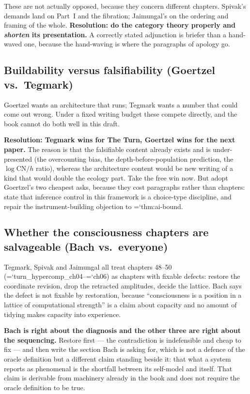 \documentclass[11pt,letterpaper]{article}
\newcommand{\loc}[1]{{\small\ttfamily\color{accent}\hyphenchar\font=`\-\relax #1}}
\newcommand{\fnd}[1]{\textbf{\color{warn}#1}}
\newcommand{\CN}{\mathrm{CN}}
\begin{document}
These are not actually opposed, because they concern different
chapters. Spivak's demands land on Part~I and the fibration; Jaimungal's
on the ordering and framing of the whole. \fnd{Resolution: do the
category theory properly and \emph{shorten} its presentation.} A
correctly stated adjunction is briefer than a hand-waved one, because
the hand-waving is where the paragraphs of apology go.

\subsection*{Buildability versus falsifiability (Goertzel vs.\ Tegmark)}

Goertzel wants an architecture that runs; Tegmark wants a number that
could come out wrong. Under a fixed writing budget these compete
directly, and the book cannot do both well in this draft.

\fnd{Resolution: Tegmark wins for The Turn, Goertzel wins for the next
paper.} The reason is that the falsifiable content already exists and
is under-presented (the overcounting bias, the depth-before-population
prediction, the $\log \CN / h$ ratio), whereas the architecture content
would be new writing of a kind that would double the ecology part. Take
the free win now. But adopt Goertzel's two cheapest asks, because they
cost paragraphs rather than chapters: state that inference control in
this framework is a choice-type discipline, and repair the
instrument-building objection to \loc{thm:ai-bound}.

\subsection*{Whether the consciousness chapters are salvageable
(Bach vs.\ everyone)}

Tegmark, Spivak and Jaimungal all treat
chapters 48--50 (\loc{turn\_hypercomp\_ch04}--\loc{ch06}) as chapters with fixable
defects: restore the coordinate revision, drop the retracted
amplitudes, decide the lattice. Bach says the defect is not fixable by
restoration, because ``consciousness is a position in a lattice of
computational strength'' is a claim about capacity and no amount of
tidying makes capacity into experience.

\fnd{Bach is right about the diagnosis and the other three are right
about the sequencing.} Restore first --- the contradiction is
indefensible and cheap to fix --- and then write the section Bach is
asking for, which is not a defence of the oracle definition but a
different claim standing beside it: that what a system reports as
phenomenal is the shortfall between its self-model and itself. That
claim is derivable from machinery already in the book and does not
require the oracle definition to be true.
\end{document}

